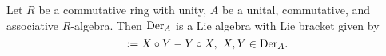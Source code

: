 \begin{corollary}
  Let $R$ be a commutative ring with unity,
  $A$ be a unital, commutative, and associative $R$-algebra.
  Then ${\rm Der}_A$ is a Lie algebra with Lie bracket given by
  \begin{equation}
    [X, Y] := X \circ Y - Y \circ X,\ X, Y \in {\rm Der}_A. 
  \end{equation}
\end{corollary}

